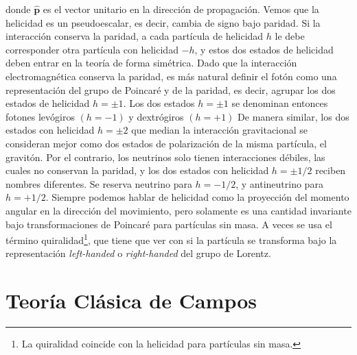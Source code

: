 \documentclass[a4paper,11pt]{book} %
\begin{document}
donde $\hat{\mathbf{p}}$ es el vector unitario en la dirección de propagación. 
\medskip\newline
Vemos que la helicidad es un pseudoescalar, es decir, cambia de signo bajo paridad. Si la interacción conserva la paridad, a cada partícula de helicidad $h$ le debe corresponder otra partícula con helicidad $-h$, y estos dos estados de helicidad deben entrar en la teoría de forma simétrica. 
\medskip\newline
Dado que la interacción electromagnética conserva la paridad, es más natural definir el fotón como una representación del grupo de Poincaré y de la paridad, es decir, agrupar los dos estados de helicidad $h=\pm1$. Los dos estados $h=\pm1$ se denominan entonces fotones levógiros $(h=-1)$ y dextrógiros $(h=+1)$
\medskip\newline
De manera similar, los dos estados con helicidad $h=\pm2$ que median la interacción gravitacional se consideran mejor como dos estados de polarización de la misma partícula, el gravitón.
\medskip\newline
Por el contrario, los neutrinos solo tienen interacciones débiles, las cuales no conservan la paridad, y los dos estados con helicidad $h=\pm1/2$ reciben nombres diferentes. Se reserva neutrino para $h=-1/2$, y antineutrino para $h=+1/2$.
\medskip\newline
Siempre podemos hablar de helicidad como la proyección del momento angular en la dirección del movimiento, pero solamente es una cantidad invariante bajo transformaciones de Poincaré para partículas sin masa. 
\medskip\newline
A veces se usa el término quiralidad\footnote{ La quiralidad coincide con la helicidad para partículas sin masa.
}, que tiene que ver con si la partícula
se transforma bajo la representación \textit{left-handed} o \textit{right-handed} del grupo de Lorentz.
\chapter{Teoría Clásica de Campos}
\noindent
\clearpage

\end{document}
